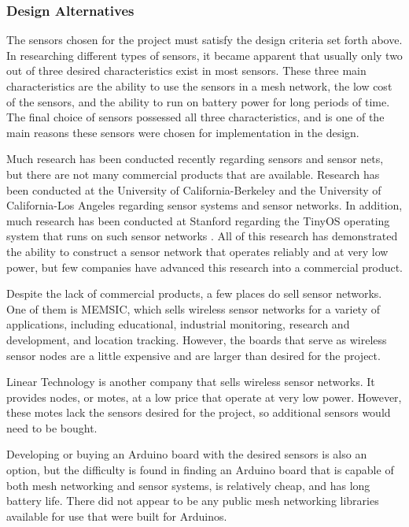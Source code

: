 \documentclass[PPFS.tex]{template/subfiles}
\begin{document}
\subsubsection{Design Alternatives}

The sensors chosen for the project must satisfy the design criteria set forth above. In researching different types of sensors, it became apparent that usually only two out of three desired characteristics exist in most sensors. These three main characteristics are the ability to use the sensors in a mesh network, the low cost of the sensors, and the ability to run on battery power for long periods of time. The final choice of sensors possessed all three characteristics, and is one of the main reasons these sensors were chosen for implementation in the design.

Much research has been conducted recently regarding sensors and sensor nets, but there are not many commercial products that are available. Research has been conducted at the University of California-Berkeley \cite{Berkeley_SmartDust, Berkeley_Nest} and the University of California-Los Angeles \cite{UCLA} regarding sensor systems and sensor networks. In addition, much research has been conducted at Stanford regarding the TinyOS operating system that runs on such sensor networks \cite{TinyOS}. All of this research has demonstrated the ability to construct a sensor network that operates reliably and at very low power, but few companies have advanced this research into a commercial product.

Despite the lack of commercial products, a few places do sell sensor networks. One of them is MEMSIC, which sells wireless sensor networks for a variety of applications, including educational, industrial monitoring, research and development, and location tracking. However, the boards that serve as wireless sensor nodes are a little expensive and are larger than desired for the project. \cite{Memsic}

Linear Technology is another company that sells wireless sensor networks. It provides nodes, or motes, at a low price that operate at very low power. However, these motes lack the sensors desired for the project, so additional sensors would need to be bought. \cite{LinearTech}

Developing or buying an Arduino board with the desired sensors is also an option, but the difficulty is found in finding an Arduino board that is capable of both mesh networking and sensor systems, is relatively cheap, and has long battery life. \cite{Arduino} There did not appear to be any public mesh networking libraries available for use that were built for Arduinos.
\end{document}
